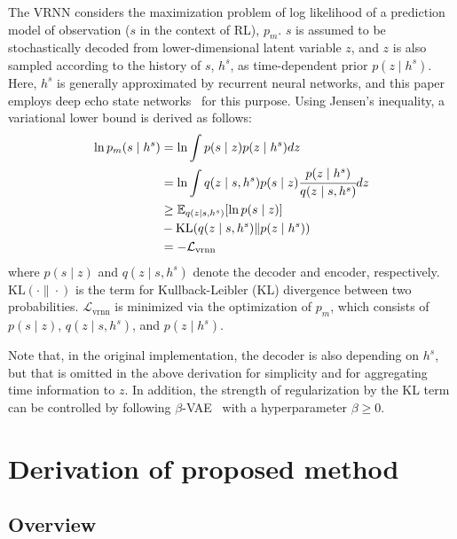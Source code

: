 \documentclass{bmcart}
\begin{document}
The VRNN considers the maximization problem of log likelihood of a prediction model of observation ($s$ in the context of RL), $p_m$.
$s$ is assumed to be stochastically decoded from lower-dimensional latent variable $z$, and $z$ is also sampled according to the history of $s$, $h^s$, as time-dependent prior $p(z \mid h^s)$.
Here, $h^s$ is generally approximated by recurrent neural networks, and this paper employs deep echo state networks~\cite{gallicchio2018design} for this purpose.
Using Jensen's inequality, a variational lower bound is derived as follows:
\begin{align}
    \ln p_m(s \mid h^s) &= \ln \int p(s \mid z) p(z \mid h^s) dz
    \nonumber \\
    &= \ln \int q(z \mid s, h^s) p(s \mid z) \cfrac{p(z \mid h^s)}{q(z \mid s, h^s)} dz
    \nonumber \\
    &\geq \mathbb{E}_{q(z \mid s, h^s)}[\ln p(s \mid z)]
    \nonumber \\
    &- \mathrm{KL}(q(z \mid s, h^s) \| p(z \mid h^s))
    \nonumber \\
    &= - \mathcal{L}_\mathrm{vrnn}
    \label{eq:loss_vrnn}
\end{align}
where $p(s \mid z)$ and $q(z \mid s, h^s)$ denote the decoder and encoder, respectively.
$\mathrm{KL}(\cdot \| \cdot)$ is the term for Kullback-Leibler (KL) divergence between two probabilities.
$\mathcal{L}_\mathrm{vrnn}$ is minimized via the optimization of $p_m$, which consists of $p(s \mid z)$, $q(z \mid s, h^s)$, and $p(z \mid h^s)$.

Note that, in the original implementation\cite{chung2015recurrent}, the decoder is also depending on $h^s$, but that is omitted in the above derivation for simplicity and for aggregating time information to $z$.
In addition, the strength of regularization by the KL term can be controlled by following $\beta$-VAE~\cite{higgins2017beta} with a hyperparameter $\beta \geq 0$.

\section{Derivation of proposed method}

\subsection{Overview}
\end{document}

